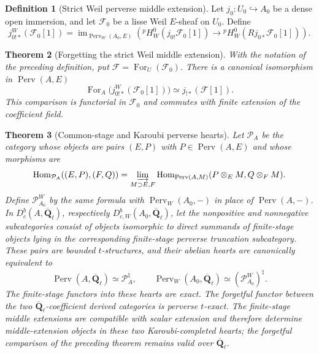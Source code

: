 \documentclass[10pt]{article}
\newtheorem{theorem}{Theorem}[section]
\theoremstyle{definition}
\newtheorem{definition}[theorem]{Definition}
\newcommand{\Qlb}{\overline{\mathbf Q}_\ell}
\newcommand{\Dbc}{D^b_c}
\newcommand{\DbcW}{D^b_{c,W}}
\newcommand{\Perv}{\operatorname{Perv}}
\newcommand{\PervW}{\operatorname{Perv}_W}
\begin{document}
\begin{definition}[Strict Weil perverse middle extension]
Let \(j_0:U_0\hookrightarrow A_0\) be a dense open immersion, and let
\(\mathcal F_0\) be a lisse Weil \(E\)-sheaf on \(U_0\).  Define
\[
 j_{0!*}^W(\mathcal F_0[1])=
 \operatorname{im}_{\PervW(A_0,E)}\!\left(
 {}^pH_W^0(j_{0!}\mathcal F_0[1])\longrightarrow
 {}^pH_W^0(Rj_{0*}\mathcal F_0[1])\right).
\]
\end{definition}

\begin{theorem}[Forgetting the strict Weil middle extension]
With the notation of the preceding definition, put
\(\mathcal F=\operatorname{For}_{U}(\mathcal F_0)\).  There is a canonical
isomorphism in \(\Perv(A,E)\)
\[
 \operatorname{For}_A\bigl(j_{0!*}^W(\mathcal F_0[1])\bigr)
       \simeq j_{!*}(\mathcal F[1]).
\]
This comparison is functorial in \(\mathcal F_0\) and commutes with finite
extension of the coefficient field.
\end{theorem}

\begin{theorem}[Common-stage and Karoubi perverse hearts]
Let \(\mathcal P_A\) be the category whose objects are pairs \((E,P)\) with
\(P\in\Perv(A,E)\) and whose morphisms are
\[
 \operatorname{Hom}_{\mathcal P_A}((E,P),(F,Q))=
 \varinjlim_{M\supset E,F}
 \operatorname{Hom}_{\Perv(A,M)}
 (P\otimes_E M,Q\otimes_F M).
\]
Define \(\mathcal P^W_{A_0}\) by the same formula with
\(\PervW(A_0,-)\) in place of \(\Perv(A,-)\).  In
\(\Dbc(A,\Qlb)\), respectively \(\DbcW(A_0,\Qlb)\), let the nonpositive
and nonnegative subcategories consist of objects isomorphic to direct
summands of finite-stage objects lying in the corresponding finite-stage
perverse truncation subcategory.  These pairs are bounded
\(t\)-structures, and their abelian hearts are canonically equivalent to
\[
 \Perv(A,\Qlb)\simeq\mathcal P_A^\natural,
 \qquad
 \PervW(A_0,\Qlb)\simeq(\mathcal P^W_{A_0})^\natural.
\]
The finite-stage functors into these hearts are exact.  The forgetful
functor between the two \(\Qlb\)-coefficient derived categories is
perverse \(t\)-exact.  The finite-stage middle extensions are compatible
with scalar extension and therefore determine middle-extension objects in
these two Karoubi-completed hearts; the forgetful comparison of the
preceding theorem remains valid over \(\Qlb\).
\end{theorem}
\end{document}
